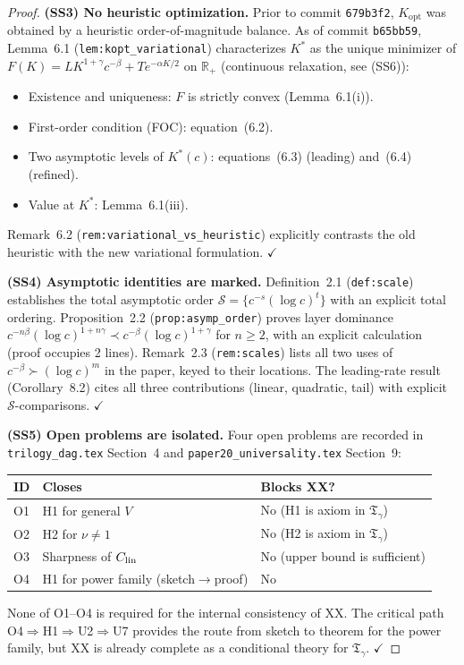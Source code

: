 \documentclass[12pt,a4paper]{amsart}
\theoremstyle{definition}
\newcommand{\Tg}{\mathfrak{T}_\gamma}
\newcommand{\R}{\mathbb{R}}
\newcommand{\Kopt}{K_{\mathrm{opt}}}
\begin{document}
\begin{proof}
\medskip
\textbf{(SS3) No heuristic optimization.}
Prior to commit \texttt{679b3f2}, $\Kopt$ was obtained by
a heuristic order-of-magnitude balance.
As of commit \texttt{b65bb59},
Lemma~6.1 (\texttt{lem:kopt\_variational}) characterizes $K^*$
as the unique minimizer of
$F(K) = LK^{1+\gamma}c^{-\beta} + Te^{-\alpha K/2}$
on $\R_+$ (continuous relaxation, see (SS6)):
\begin{itemize}[nosep]
  \item Existence and uniqueness: $F$ is strictly convex
    (Lemma~6.1(i)).
  \item First-order condition (FOC): equation~(6.2).
  \item Two asymptotic levels of $K^*(c)$:
    equations~(6.3) (leading) and~(6.4) (refined).
  \item Value at $K^*$: Lemma~6.1(iii).
\end{itemize}
Remark~6.2 (\texttt{rem:variational\_vs\_heuristic})
explicitly contrasts the old heuristic with the new variational
formulation.
\hfill$\checkmark$

\medskip
\textbf{(SS4) Asymptotic identities are marked.}
Definition~2.1 (\texttt{def:scale}) establishes the total
asymptotic order $\mathcal{S} = \{c^{-s}(\log c)^t\}$
with an explicit total ordering.
Proposition~2.2 (\texttt{prop:asymp\_order}) proves layer
dominance $c^{-n\beta}(\log c)^{1+n\gamma}\prec
c^{-\beta}(\log c)^{1+\gamma}$ for $n\geq 2$,
with an explicit calculation (proof occupies 2 lines).
Remark~2.3 (\texttt{rem:scales}) lists all two uses of
$c^{-\beta}\succ(\log c)^m$ in the paper, keyed to their
locations.
The leading-rate result (Corollary~8.2) cites all three
contributions (linear, quadratic, tail) with explicit
$\mathcal{S}$-comparisons.
\hfill$\checkmark$

\medskip
\textbf{(SS5) Open problems are isolated.}
Four open problems are recorded in
\texttt{trilogy\_dag.tex} Section~4 and
\texttt{paper20\_universality.tex} Section~9:
\begin{center}
\begin{tabular}{l l l}
\toprule
\textbf{ID} & \textbf{Closes} & \textbf{Blocks XX?} \\
\midrule
O1 & H1 for general $V$ & No (H1 is axiom in $\Tg$) \\
O2 & H2 for $\nu\neq 1$ & No (H2 is axiom in $\Tg$) \\
O3 & Sharpness of $C_{\rm lin}$ & No (upper bound is sufficient) \\
O4 & H1 for power family (sketch$\to$proof) & No \\
\bottomrule
\end{tabular}
\end{center}
None of O1--O4 is required for the internal consistency of XX.
The critical path O4$\Rightarrow$H1$\Rightarrow$U2$\Rightarrow$U7
provides the route from sketch to theorem
for the power family, but XX is already complete
as a conditional theory for $\Tg$.
\hfill$\checkmark$


\end{proof}
\end{document}
